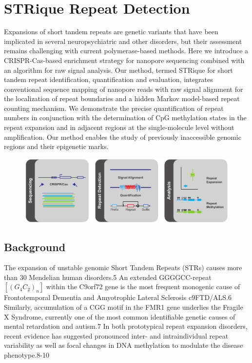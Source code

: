 \chapter{STRique Repeat Detection}
\label{sec:strique}

Expansions of short tandem repeats are genetic variants that have been implicated in several neuropsychiatric and other disorders, but their assessment remains challenging with current polymerase-based methods. Here we introduce a CRISPR-Cas-based enrichment strategy for nanopore sequencing combined with an algorithm for raw signal analysis. Our method, termed STRique for short tandem repeat identification, quantification and evaluation, integrates conventional sequence mapping of nanopore reads with raw signal alignment for the localization of repeat boundaries and a hidden Markov model-based repeat counting mechanism. We demonstrate the precise quantification of repeat numbers in conjunction with the determination of CpG methylation states in the repeat expansion and in adjacent regions at the single-molecule level without amplification. Our method enables the study of previously inaccessible genomic regions and their epigenetic marks.

\begin{figure}[h]
    \centering
    \includegraphics[width=1.0\textwidth]{figures/strique/GA.pdf}
    \label{fig:strique:ga}
\end{figure}




\section{Background}
\label{sec:strique:background}

The expansion of unstable genomic Short Tandem Repeats (STRs) causes more than 30 Mendelian human disorders.5 An extended GGGGCC-repeat $ [(G_{4}C_{2})_{n}] $ within the C9orf72 gene is the most frequent monogenic cause of Frontotemporal Dementia and Amyotrophic Lateral Sclerosis c9FTD/ALS.6 Similarly, accumulation of a CGG motif in the FMR1 gene underlies the Fragile X Syndrome, currently one of the most common identifiable genetic causes of mental retardation and autism.7 In both prototypical repeat expansion disorders, recent evidence has suggested pronounced inter- and intraindividual repeat variability as well as focal changes in DNA methylation to modulate the disease phenotype.8-10

